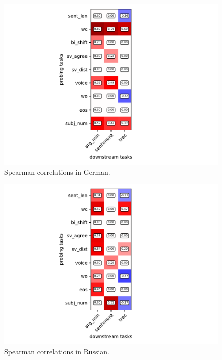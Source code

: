 \begin{minipage}{0.49\textwidth}
	\begin{figure}[H]
		\centering
		\includegraphics[scale=0.675]{images/spearman_corr_de_f1}
		\caption[Spearman correlations between probing and downstream task performances in German (F1 scores)]
			{Spearman correlations in German.}
		\label{fig:correlations_probing_downstream_de}
	\end{figure}
\end{minipage}
\hfill
\begin{minipage}{0.49\textwidth}
	\begin{figure}[H]
		\centering
		\includegraphics[scale=0.675]{images/spearman_corr_ru_f1}
		\caption[Spearman correlations between probing and downstream task performances in Russian (F1 scores)]
			{Spearman correlations in Russian.}
		\label{fig:correlations_probing_downstream_ru}
	\end{figure}
\end{minipage}

